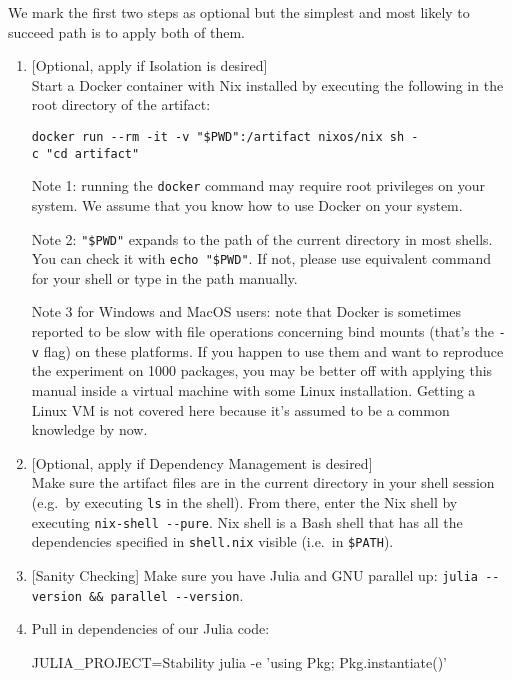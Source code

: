 \documentclass[
]{article}
\begin{document}
We mark the first two steps as optional but the simplest and most likely
to succeed path is to apply both of them.

\begin{enumerate}
\def\labelenumi{\arabic{enumi}.}
\item
  {[}Optional, apply if Isolation is desired{]}\\
  Start a Docker container with Nix installed by executing the following
  in the root directory of the artifact:

  \texttt{docker\ run\ -\/-rm\ -it\ -v\ "\$PWD":/artifact\ nixos/nix\ sh\ -c\ "cd\ artifact"}

  Note 1: running the \texttt{docker} command may require root
  privileges on your system. We assume that you know how to use Docker
  on your system.

  Note 2: \texttt{"\$PWD"} expands to the path of the current directory
  in most shells. You can check it with \texttt{echo\ "\$PWD"}. If not,
  please use equivalent command for your shell or type in the path
  manually.

  Note 3 for Windows and MacOS users: note that Docker is sometimes
  reported to be slow with file operations concerning bind mounts
  (that's the \texttt{-v} flag) on these platforms. If you happen to use
  them and want to reproduce the experiment on 1000 packages, you may be
  better off with applying this manual inside a virtual machine with
  some Linux installation. Getting a Linux VM is not covered here
  because it's assumed to be a common knowledge by now.
\item
  {[}Optional, apply if Dependency Management is desired{]}\\
  Make sure the artifact files are in the current directory in your
  shell session (e.g.~by executing \texttt{ls} in the shell). From
  there, enter the Nix shell by executing \texttt{nix-shell\ -\/-pure}.
  Nix shell is a Bash shell that has all the dependencies specified in
  \texttt{shell.nix} visible (i.e.~in \texttt{\$PATH}).
\item
  {[}Sanity Checking{]} Make sure you have Julia and GNU parallel up:
  \texttt{julia\ -\/-version\ \&\&\ parallel\ -\/-version}.
\item
  Pull in dependencies of our Julia code:

\begin{verbnobox}[\small]
JULIA_PROJECT=Stability julia -e 'using Pkg; Pkg.instantiate()'
\end{verbnobox}
\end{enumerate}
\end{document}
